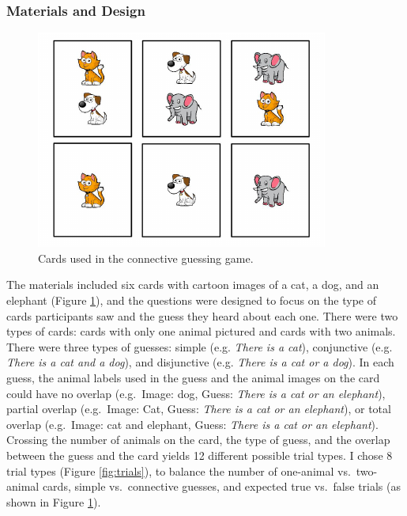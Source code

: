 \documentclass[oneside]{report}
\theoremstyle{definition}
\theoremstyle{definition}
\theoremstyle{definition}
\theoremstyle{remark}
\begin{document}
\subsubsection{Materials and Design}\label{materials-and-design}
\begin{figure}[t]

{\centering \includegraphics{figs/stimuli-1} 

}

\caption{Cards used in the connective guessing game.}\label{fig:stimuli}
\end{figure}
The materials included six cards with cartoon images of a cat, a dog,
and an elephant (Figure \ref{fig:stimuli}), and the questions were
designed to focus on the type of cards participants saw and the guess
they heard about each one. There were two types of cards: cards with
only one animal pictured and cards with two animals. There were three
types of guesses: simple (e.g. \emph{There is a cat}), conjunctive (e.g.
\emph{There is a cat and a dog}), and disjunctive (e.g. \emph{There is a
cat or a dog}). In each guess, the animal labels used in the guess and
the animal images on the card could have no overlap (e.g.~Image: dog,
Guess: \emph{There is a cat or an elephant}), partial overlap
(e.g.~Image: Cat, Guess: \emph{There is a cat or an elephant}), or total
overlap (e.g.~Image: cat and elephant, Guess: \emph{There is a cat or an
elephant}). Crossing the number of animals on the card, the type of
guess, and the overlap between the guess and the card yields 12
different possible trial types. I chose 8 trial types (Figure
\ref{fig:trials}), to balance the number of one-animal vs.~two-animal
cards, simple vs.~connective guesses, and expected true vs.~false trials
(as shown in Figure \ref{fig:stimuli}).
\end{document}
